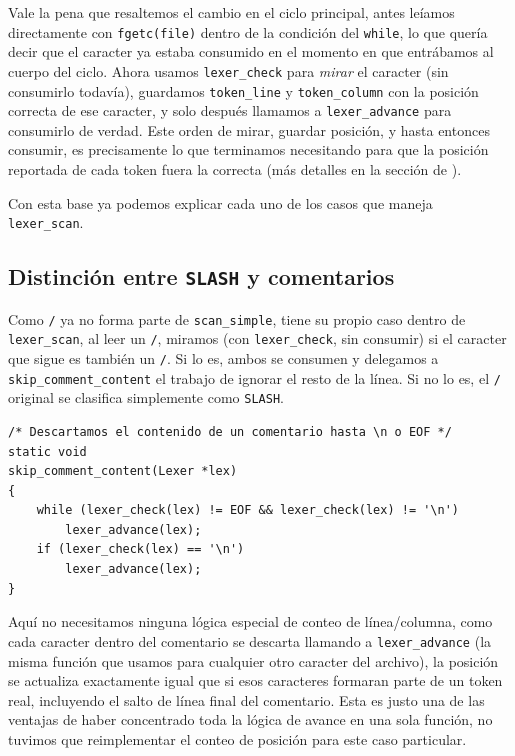 \documentclass[12pt,letterpaper]{article}
\begin{document}
\bigskip

Vale la pena que resaltemos el cambio en el ciclo principal, antes leíamos directamente con
\texttt{fgetc(file)} dentro de la condición del \texttt{while}, lo que quería decir que el caracter ya estaba
consumido en el momento en que entrábamos al cuerpo del ciclo. Ahora usamos \texttt{lexer\_check} para
\emph{mirar} el caracter (sin consumirlo todavía), guardamos \texttt{token\_line} y \texttt{token\_column} con
la posición correcta de ese caracter, y solo después llamamos a \texttt{lexer\_advance} para consumirlo de
verdad. Este orden de mirar, guardar posición, y hasta entonces consumir, es precisamente lo que terminamos
necesitando para que la posición reportada de cada token fuera la correcta (más detalles en la sección de
).

Con esta base ya podemos explicar cada uno de los casos que maneja \texttt{lexer\_scan}.

\subsection*{Distinción entre \texttt{SLASH} y comentarios}

Como \texttt{/} ya no forma parte de \texttt{scan\_simple}, tiene su propio caso dentro de
\texttt{lexer\_scan}, al leer un \texttt{/}, miramos (con \texttt{lexer\_check}, sin consumir) si el
caracter que sigue es también un \texttt{/}. Si lo es, ambos se consumen y delegamos a
\texttt{skip\_comment\_content} el trabajo de ignorar el resto de la línea. Si no lo es, el \texttt{/} original
se clasifica simplemente como \texttt{SLASH}.

\begin{lstlisting}[style=modernc, caption={Función \texttt{skip\_comment\_content}.}]
/* Descartamos el contenido de un comentario hasta \n o EOF */
static void
skip_comment_content(Lexer *lex)
{
    while (lexer_check(lex) != EOF && lexer_check(lex) != '\n')
        lexer_advance(lex);
    if (lexer_check(lex) == '\n')
        lexer_advance(lex);
}
\end{lstlisting}

\bigskip

Aquí no necesitamos ninguna lógica especial de conteo de línea/columna, como cada caracter dentro del
comentario se descarta llamando a \texttt{lexer\_advance} (la misma función que usamos para cualquier otro
caracter del archivo), la posición se actualiza exactamente igual que si esos caracteres formaran parte de un
token real, incluyendo el salto de línea final del comentario. Esta es justo una de las ventajas de haber
concentrado toda la lógica de avance en una sola función, no tuvimos que reimplementar el conteo de posición
para este caso particular.
\end{document}
